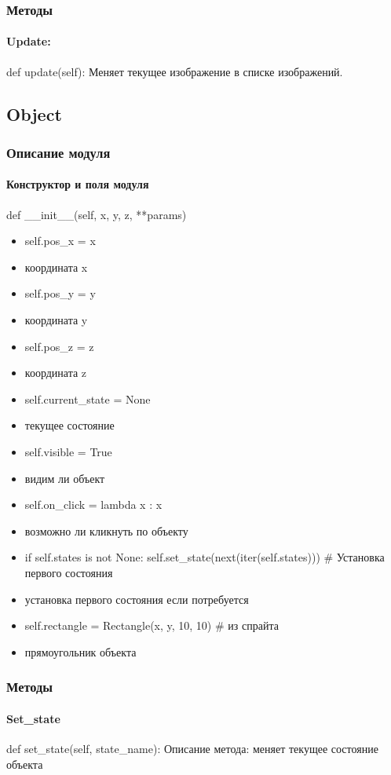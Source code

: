 \subsubsection{Методы}
\paragraph{Update:}
def update(self):
Меняет текущее изображение в списке изображений.

\subsection{Object}
\subsubsection{Описание модуля}
\paragraph{Конструктор и поля модуля}
def \_\_init\_\_(self, x, y, z, **params)
\begin{itemize}
	\item self.pos\_x = x
	\item координата x
	\item self.pos\_y = y
	\item координата y
	\item self.pos\_z = z
	\item координата z
	\item self.current\_state = None
	\item текущее состояние
	\item self.visible = True
	\item видим ли объект
	\item self.on\_click = lambda x : x
	\item возможно ли кликнуть по объекту
	\item if self.states is not None:
	self.set\_state(next(iter(self.states)))  # Установка первого состояния
	\item установка первого состояния если потребуется
	\item self.rectangle = Rectangle(x, y, 10, 10) # из спрайта
	\item прямоугольник объекта
\end{itemize}
\subsubsection{Методы}
\paragraph{Set\_state}
def set\_state(self, state\_name):
Описание метода: меняет текущее состояние объекта
